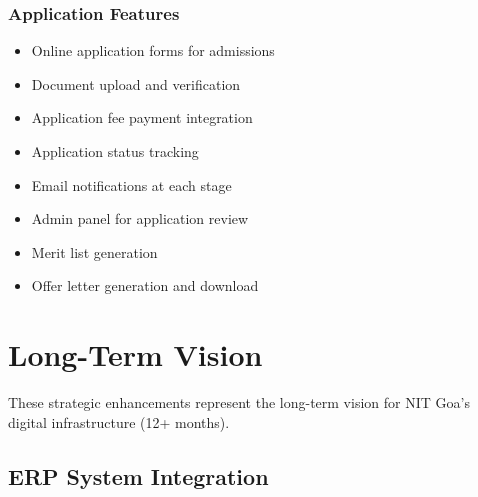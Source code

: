 \documentclass[12pt,a4paper]{report}
\begin{document}
\subsubsection*{Application Features}
\begin{itemize}
    \item Online application forms for admissions
    \item Document upload and verification
    \item Application fee payment integration
    \item Application status tracking
    \item Email notifications at each stage
    \item Admin panel for application review
    \item Merit list generation
    \item Offer letter generation and download
\end{itemize}

\section{Long-Term Vision}

These strategic enhancements represent the long-term vision for NIT Goa's digital infrastructure (12+ months).

\subsection{ERP System Integration}
\end{document}
